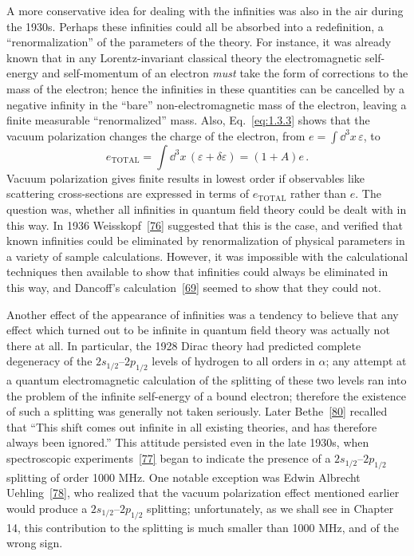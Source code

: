 A more conservative idea for dealing with the infinities was also in the air during the 1930s. Perhaps these infinities could all be absorbed into a redefinition, a ``renormalization'' of the parameters of the theory. For instance, it was already known that in any Lorentz-invariant classical theory the electromagnetic self-energy and self-momentum of an electron \emph{must} take the form of corrections to the mass of the electron; hence the infinities in these quantities can be cancelled by a negative infinity in the ``bare'' non-electromagnetic mass of the electron, leaving a finite measurable ``renormalized'' mass. Also, Eq.~\eqref{eq:1.3.3} shows that the vacuum polarization changes the charge of the electron, from $e=\int \dd^3x\,\varepsilon$, to
\begin{equation}
  e_{\mathrm{TOTAL}}=\int \dd^3x\,(\varepsilon+\delta\varepsilon)=(1+A)e\,.
  \tag{1.3.5}\label{eq:1.3.5}
\end{equation}
Vacuum polarization gives finite results in lowest order if observables like scattering cross-sections are expressed in terms of $e_{\mathrm{TOTAL}}$ rather than $e$. The question was, whether all infinities in quantum field theory could be dealt with in this way. In 1936 Weisskopf~\hyperref[ref:1.76]{[76]} suggested that this is the case, and verified that known infinities could be eliminated by renormalization of physical parameters in a variety of sample calculations. However, it was impossible with the calculational techniques then available to show that infinities could always be eliminated in this way, and Dancoff's calculation~\hyperref[ref:1.69]{[69]} seemed to show that they could not.

Another effect of the appearance of infinities was a tendency to believe that any effect which turned out to be infinite in quantum field theory was actually not there at all. In particular, the 1928 Dirac theory had predicted complete degeneracy of the $2s_{1/2}$--$2p_{1/2}$ levels of hydrogen to all orders in $\alpha$; any attempt at a quantum electromagnetic calculation of the splitting of these two levels ran into the problem of the infinite self-energy of a bound electron; therefore the existence of such a splitting was generally not taken seriously. Later Bethe~\hyperref[ref:1.80]{[80]} recalled that ``This shift comes out infinite in all existing theories, and has therefore always been ignored.'' This attitude persisted even in the late 1930s, when spectroscopic experiments~\hyperref[ref:1.77]{[77]} began to indicate the presence of a $2s_{1/2}$--$2p_{1/2}$ splitting of order 1000 MHz. One notable exception was Edwin Albrecht Uehling~\hyperref[ref:1.78]{[78]}, who realized that the vacuum polarization effect mentioned earlier would produce a $2s_{1/2}$--$2p_{1/2}$ splitting; unfortunately, as we shall see in Chapter 14, this contribution to the splitting is much smaller than 1000 MHz, and of the wrong sign.

